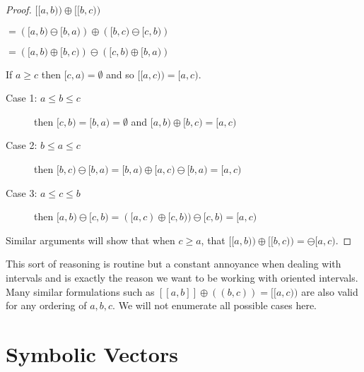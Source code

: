 
\begin{theorem}
	For all $a,b,c \in \mathbb{R}$ (regardless of relative ordering),
	\begin{equation}
		[\![ a,b )\!) \oplus [\![ b,c )\!) = [\![ a,c )\!)
	\end{equation}
\end{theorem}

\begin{proof}
	$[\![a,b)\!) \oplus [\![ b,c )\!)$ 

	$= \left( [a,b) \ominus [b,a) \right) \oplus \left( [b,c) \ominus [c,b) \right)$ 

	$= \left( [a,b) \oplus [b,c) \right) \ominus \left( [c,b) \oplus [b,a) \right)$

	If $a \geq c$ then $[c,a) = \emptyset$ and so $[\![a,c)\!) = [a,c)$. 
	\begin{description}
		\item[Case 1: $a \leq b \leq c$] then $[c,b) = [b,a) = \emptyset$ and $[a,b) \oplus [b,c) = [a,c)$
		\item[Case 2: $b \leq a \leq c$] then $[b,c) \ominus [b,a) = [b,a) \oplus [a,c) \ominus [b,a) = [a,c)$
		\item[Case 3: $a \leq c \leq b$] then $[a,b) \ominus [c,b) = ([a,c) \oplus [c,b)) \ominus [c,b) = [a,c)$
	\end{description}
	Similar arguments will show that when $c \geq a$, that $[\![a,b)\!) \oplus [\![ b,c )\!) = \ominus [a,c)$.
	
\end{proof}

This sort of reasoning is routine but a constant annoyance when dealing with intervals and is exactly the reason we want to be working with oriented intervals.
Many similar formulations such as $[\![ a,b ]\!] \oplus (\!( b,c )\!) = [\![a,c)\!)$ are also valid for any ordering of $a,b,c$.
We will not enumerate all possible cases here.


\newpage




%
%

\section{Symbolic Vectors}

